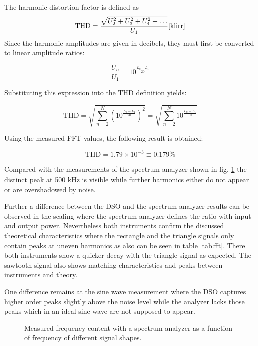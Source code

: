 \documentclass[a4paper,12pt]{article}
\begin{document}
	The harmonic distortion factor is defined as
	\[
	\mathrm{THD}=\frac{\sqrt{U_2^2+U_3^2+U_4^2+\dots}}{U_1} \cite{klirr}
	\]
	Since the harmonic amplitudes are given in decibels, they must first be converted to
	linear amplitude ratios:
	
	\[
	\frac{U_n}{U_1}
	=
	10^{\frac{L_n - L_1}{20}}
	\]
	
	Substituting this expression into the THD definition yields:
	
	\[
	\mathrm{THD}
	=
	\sqrt{
		\sum_{n=2}^{N}
		\left(10^{\frac{L_n - L_1}{20}}\right)^2
	}
	=
	\sqrt{
		\sum_{n=2}^{N}
		10^{\frac{L_n - L_1}{10}}
	}
	\]
	
	Using the measured FFT values, the following result is obtained:
	
	\[
	\mathrm{THD} = 1.79 \times 10^{-3} \equiv 0.179\%
	\]
	
	Compared with the measurements of the spectrum analyzer shown in fig. \ref{fig:four_signals} the distinct peak at 500 kHz is visible while further harmonics either do not appear or are overshadowed by noise.
	
	Further a difference between the DSO and the spectrum analyzer results can be observed in the scaling where the spectrum analyzer defines the ratio with input and output power. Nevertheless both instruments confirm the discussed theoretical characteristics where the rectangle and the triangle signals only contain peaks at uneven harmonics as also can be seen in table \ref{tab:fft}. There both instruments show a quicker decay with the triangle signal as expected. The sawtooth signal also shows matching characteristics and peaks between instruments and theory.
	
	One difference remains at the sine wave measurement where the DSO captures higher order peaks slightly above the noise level while the analyzer lacks those peaks which in an ideal sine wave are not supposed to appear.
	
%		
%	
	\begin{figure}[H]
		\centering
		
		\caption{Measured frequency content with a spectrum analyzer as a function of frequency of different signal shapes.}
		\label{fig:four_signals}
	\end{figure}
	
\end{document}
